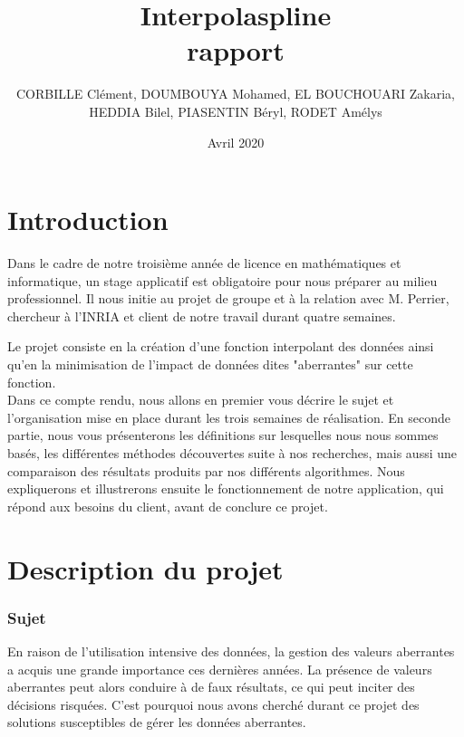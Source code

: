 \documentclass[a4paper,12pt]{article} %
\title{\textbf{Interpolaspline}\\ rapport}
\author{CORBILLE Clément, DOUMBOUYA Mohamed, EL BOUCHOUARI Zakaria, \\HEDDIA Bilel, PIASENTIN Béryl, RODET Amélys }
\date{Avril 2020}
\begin{document}
\maketitle

\newpage
\tableofcontents

\newpage

\renewcommand\partname{}
\part{Introduction}
    Dans le cadre de notre troisième année de licence en mathématiques et informatique, un stage applicatif est obligatoire pour nous préparer au milieu professionnel. Il nous initie au projet de groupe et à la relation avec M. Perrier, chercheur à l'INRIA et client de notre travail durant quatre semaines. 
    
    Le projet consiste en la création d'une fonction interpolant des données ainsi qu'en la minimisation de l'impact de données dites "aberrantes" sur cette fonction.\\ %

    Dans ce compte rendu, nous allons en premier vous décrire le sujet et l'organisation mise en place durant les trois semaines de réalisation. En seconde partie, nous vous présenterons les définitions sur lesquelles nous nous sommes basés, les différentes méthodes découvertes suite à nos recherches, mais aussi une comparaison des résultats produits par nos différents algorithmes. Nous expliquerons et illustrerons ensuite le fonctionnement de notre application, qui répond aux besoins du client, avant de conclure ce projet.

\renewcommand\partname{}
\part{Description du projet}
	\section{Sujet}
	    En raison de l'utilisation intensive des données, la gestion des valeurs aberrantes a acquis une grande importance ces dernières années. La présence de valeurs aberrantes peut alors conduire à de faux résultats, ce qui peut inciter des décisions risquées.
		C'est pourquoi nous avons cherché durant ce projet des solutions susceptibles de gérer les données aberrantes.
	
\end{document}
